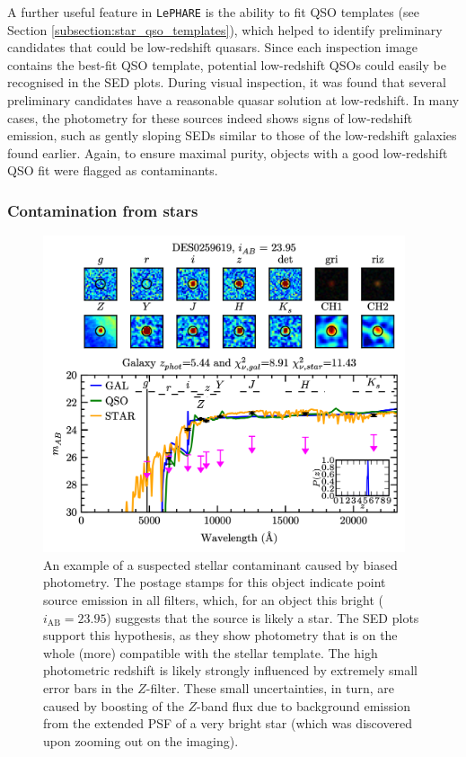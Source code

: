 
A further useful feature in \texttt{LePHARE} is the ability to fit QSO templates (see Section \ref{subsection:star_qso_templates}), which helped to identify preliminary candidates that could be low-redshift quasars. Since each inspection image contains the best-fit QSO template, potential low-redshift QSOs could easily be recognised in the SED plots. During visual inspection, it was found that several preliminary candidates have a reasonable quasar solution at low-redshift. In many cases, the photometry for these sources indeed shows signs of low-redshift emission, such as gently sloping SEDs similar to those of the low-redshift galaxies found earlier. Again, to ensure maximal purity, objects with a good low-redshift QSO fit were flagged as contaminants. \par 


\subsubsection{Contamination from stars}\label{subsubsection:contamination_stars}

\begin{figure}[tb]
\centering
\includegraphics[width=0.95\textwidth]{Chapter4/Figs/DES0259619_thesis.png}
\caption[Example of a stellar contaminant]{An example of a suspected stellar contaminant caused by biased photometry. The postage stamps for this object indicate point source emission in all filters, which, for an object this bright ($i_{\mathrm{AB}}=23.95$) suggests that the source is likely a star. The SED plots support this hypothesis, as they show photometry that is on the whole (more) compatible with the stellar template. The high photometric redshift is likely strongly influenced by extremely small error bars in the $Z$-filter. These small uncertainties, in turn, are caused by boosting of the $Z$-band flux due to background emission from the extended PSF of a very bright star (which was discovered upon zooming out on the imaging).}
\label{fig:example_star}
\end{figure}



